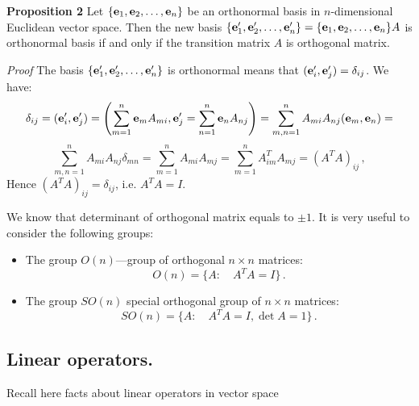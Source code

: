\documentclass[12pt]{article}
\numberwithin{equation}{section}
\begin{document}
{\bf Proposition 2}  Let $\{{\bf e}_1,{\bf e}_2,\dots,{\bf e}_n\}$ be  an 
orthonormal basis in $n$-dimensional Euclidean
vector space.  Then the new basis  $\{{\bf e}'_1,{\bf e}'_2,\dots,{\bf e}'_n\}=\{{\bf e}_1,{\bf e}_2,\dots,{\bf e}_n\}A$ is orthonormal basis if and only if the transition matrix $A$ is orthogonal matrix.

{\sl Proof}
  The basis   $\{{\bf e}'_1,{\bf e}'_2,\dots,{\bf e}'_n\}$ is orthonormal  
means that $({\bf e}'_i,{\bf e}'_j)=\delta_{ij}$. We have:
                        $$
\delta_{ij}=({\bf e}'_i,{\bf e}'_j)=\left(\sum_{m=1}^n {\bf e}_m A_{mi},{\bf e}'_j=\sum_{n=1}^n {\bf e}_n A_{nj}\right)=
        \sum_{m,n=1}^n A_{mi}A_{nj}({\bf e}_m,{\bf e}_n)=
                        $$
                        \begin{equation}\label{orthogonmatr1}
\sum_{m,n=1}^n A_{mi}A_{nj}\delta_{mn}=\sum_{m=1}^n A_{mi}A_{mj}=
\sum_{m=1}^n A^T_{im}A_{mj}=(A^TA)_{ij}\,,
\end{equation}
Hence $(A^TA)_{ij}=\delta_{ij}$, i.e. $A^TA=I$.







\m

{\footnotesize   We know that determinant of orthogonal matrix equals to $\pm 1$.
It is very useful to consider the following groups:

 \begin{itemize}

 \item  The group $O(n)$---group of  orthogonal $n\times n$ matrices:
             \begin{equation}\label{orthog.group}
    O(n)=\{A\colon \quad A^T A=I\}\,.
\end{equation}


\item  The group $SO(n)$ special orthogonal group of  $n\times n$ matrices:
             \begin{equation}\label{orthog.group}
    SO(n)=\{A\colon \quad A^T A=I, \det A=1 \}\,.
\end{equation}

\end{itemize}
}

\subsection {Linear operators.}

Recall here facts about linear operators in vector space
\end{document}
